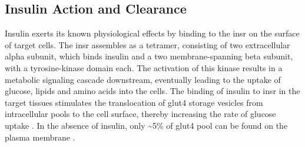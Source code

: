 


\subsection[Insulin Action and Clearance]{Insulin Action and Clearance} %
\label{sec:insact}
Insulin exerts its known physiological effects by binding to the \gls{insr} on the surface of target cells. The \gls{insr} assembles as a tetramer, consisting of two extracellular alpha subunit, which binds insulin and a two membrane-spanning beta subunit, with a tyrosine-kinase domain each. The activation of this kinase results in a metabolic signaling cascade downstream, eventually leading to the uptake of glucose, lipids and amino acids into the cells. 
The binding of insulin to \gls{insr} in the target tissues stimulates the translocation of \gls{glut}4 storage vesicles from intracellular pools to the cell surface, thereby increasing the rate of glucose uptake \textbf{\cite{shepherd_glucose_1999,saltiel_insulin_2001,leto_regulation_2012}}. In the absence of insulin, only \textasciitilde5\% of \gls{glut}4 pool can be found on the plasma membrane \textbf{\cite{leto_regulation_2012}}.\\

